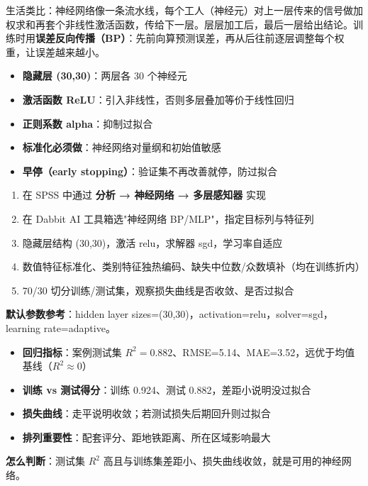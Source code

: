 \begin{algoprinciple}
生活类比：神经网络像一条流水线，每个工人（神经元）对上一层传来的信号做加权求和再套个非线性激活函数，传给下一层。层层加工后，最后一层给出结论。训练时用\textbf{误差反向传播（BP）}：先前向算预测误差，再从后往前逐层调整每个权重，让误差越来越小。

\begin{itemize}
    \item \textbf{隐藏层 (30,30)}：两层各 30 个神经元
    \item \textbf{激活函数 ReLU}：引入非线性，否则多层叠加等价于线性回归
    \item \textbf{正则系数 alpha}：抑制过拟合
    \item \textbf{标准化必须做}：神经网络对量纲和初始值敏感
    \item \textbf{早停（early stopping）}：验证集不再改善就停，防过拟合
\end{itemize}
\end{algoprinciple}

\begin{algosposs}
\begin{enumerate}
    \item 在 SPSS 中通过 \textbf{分析 → 神经网络 → 多层感知器} 实现
    \item 在 Dabbit AI 工具箱选"神经网络 BP/MLP"，指定目标列与特征列
    \item 隐藏层结构 (30,30)，激活 relu，求解器 sgd，学习率自适应
    \item 数值特征标准化、类别特征独热编码、缺失中位数/众数填补（均在训练折内）
    \item 70/30 切分训练/测试集，观察损失曲线是否收敛、是否过拟合
\end{enumerate}

\textbf{默认参数参考}：hidden layer sizes=(30,30)，activation=relu，solver=sgd，learning rate=adaptive。
\end{algosposs}

\begin{algoresult}
\begin{itemize}
    \item \textbf{回归指标}：案例测试集 $R^2=0.882$、RMSE=5.14、MAE=3.52，远优于均值基线（$R^2\approx0$）
    \item \textbf{训练 vs 测试得分}：训练 0.924、测试 0.882，差距小说明没过拟合
    \item \textbf{损失曲线}：走平说明收敛；若测试损失后期回升则过拟合
    \item \textbf{排列重要性}：配套评分、距地铁距离、所在区域影响最大
\end{itemize}

\textbf{怎么判断}：测试集 $R^2$ 高且与训练集差距小、损失曲线收敛，就是可用的神经网络。
\end{algoresult}

